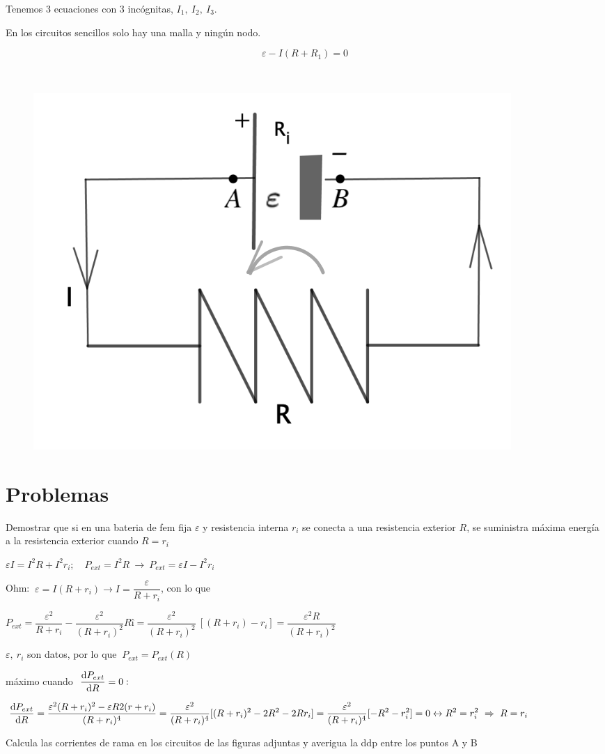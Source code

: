  Tenemos 3 ecuaciones con 3 incógnitas, $I_1,\ I_2,\ I_3$.
 

 
 \begin{multicols}{2}
En los circuitos sencillos solo hay una malla y ningún nodo.

 $$\varepsilon - I(R+R_1)=0$$
 
 $\quad$
	\begin{figure}[H]
	\centering
	\includegraphics[width=.3\textwidth]{imagenes/imagenes25/T25IM09.png}
\end{figure}
\end{multicols}
 
 \section{Problemas}

\begin{prob}
Demostrar que si en una bateria de fem fija $\varepsilon$ y resistencia interna $r_i$ se conecta a una resistencia exterior $R$, se suministra máxima energía a la resistencia exterior cuando $R=r_i$	
\end{prob}

$\varepsilon I=I^2R+I^2r_i;\quad P_{ext}=I^2R \ \to \ P_{ext}=\varepsilon I-I^2 r_i$

Ohm: $\ \varepsilon =I(R+r_i) \to I=\dfrac{\varepsilon}{R+r_i}$, con lo que

$P_{ext}=\dfrac{\varepsilon^2}{R+r_i}-\dfrac{\varepsilon^2}{(R+r_i)^2}Rî=\dfrac{\varepsilon^2}{(R+r_i)^2} \ [(R+r_i)-r_i]=\dfrac{\varepsilon^2 R}{(R+r_i)^2}$

$\varepsilon,\ r_i$ son datos, por lo que $\ P_{ext}=P_{ext}(R)$

máximo cuando $\ \displaystyle \dv{P_{ext}}{R}=0:$

$\displaystyle \dv{P_{ext}}{R}=\dfrac{\varepsilon^2(R+r_i)^2-\varepsilon R 2(r+r_i)}{(R+r_i)^4}=\dfrac{\varepsilon^2}{(R+r_i)^4} [ (R+r_i)^2-2R^2-2Rr_i ]=\dfrac{\varepsilon^2}{(R+r_i)^4} [-R^2-r_i^2]=0 \leftrightarrow R^2= r_i^2 \ \Rightarrow \ R=r_i$


\begin{prob}
Calcula las corrientes de rama en los circuitos de las figuras adjuntas y averigua la ddp entre los puntos A y B	
\end{prob}

